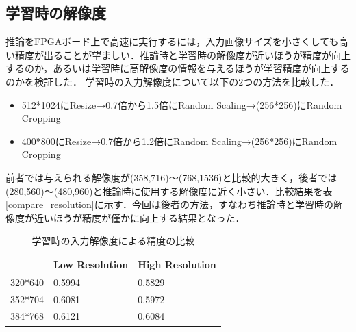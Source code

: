 \subsection{学習時の解像度}
推論をFPGAボード上で高速に実行するには，入力画像サイズを小さくしても高い精度が出ることが望ましい．推論時と学習時の解像度が近いほうが精度が向上するのか，あるいは学習時に高解像度の情報を与えるほうが学習精度が向上するのかを検証した．
学習時の入力解像度について以下の2つの方法を比較した．
\begin{itemize}
    \item{512*1024にResize→0.7倍から1.5倍にRandom Scaling→(256*256)にRandom Cropping}
    \item{400*800にResize→0.7倍から1.2倍にRandom Scaling→(256*256)にRandom Cropping}
\end{itemize}
前者では与えられる解像度が(358,716)〜(768,1536)と比較的大きく，後者では(280,560)〜(480,960)と推論時に使用する解像度に近く小さい．比較結果を表\ref{compare_resolution}に示す．今回は後者の方法，すなわち推論時と学習時の解像度が近いほうが精度が僅かに向上する結果となった．
\begin{table}[b]
    \caption{学習時の入力解像度による精度の比較} \vspace{1mm}
    \begin{center}
        \begin{tabular}{lll}
                & Low Resolution & High Resolution \\ \hline
        320*640 & 0.5994         & 0.5829            \\ \hline
        352*704 & 0.6081         & 0.5972               \\ \hline
        384*768 & 0.6121         & 0.6084
        \end{tabular}
    \end{center}
\end{table}
